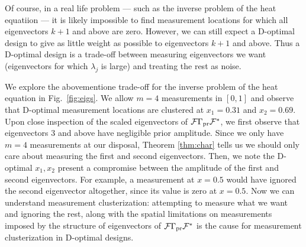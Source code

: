 Of course, in a real life problem --- such as the inverse problem of
the heat equatiion --- it is likely impossible to find measurement
locations for which all eigenvectors $k+1$ and above are
zero. However, we can still expect a D-optimal design to give as
little weight as possible to eigenvectors $k+1$ and above. Thus a
D-optimal design is a trade-off between measuring eigenvectors we want
(eigenvectors for which $\lambda_j$ is large) and treating the rest as
noise.


We explore the abovementione trade-off for the inverse problem of the
heat equation in Fig.~\ref{fig:eigs}. We allow $m=4$ measurements in
$[0,1]$ and observe that D-optimal measurement locations are clustered
at $x_1 = 0.31$ and $x_2 = 0.69$. Upon close inspection of the scaled
eigenvectors of $\mathcal{F} \Gamma_{\textup{pr}} \mathcal{F}^*$, we first observe that
eigenvectors $3$ and above have negligible prior amplitude. Since we
only have $m=4$ measurements at our disposal, Theorem \ref{thm:char}
tells us we should only care about measuring the first and second
eigenvectors. Then, we note the D-optimal $x_1,x_2$ present a
compromise between the amplitude of the first and second
eigenvectors. For example, a measurement at $x=0.5$ would have ignored
the second eigenvector altogether, since its value is zero at $x=0.5$.
Now we can understand measurement clusterization: attempting to
measure what we want and ignoring the rest, along with the spatial
limitations on measurements imposed by the structure of eigenvectors
of $\mathcal{F} \Gamma_{\textup{pr}} \mathcal{F}^*$ is the cause for measurement clusterization in
D-optimal designs.




